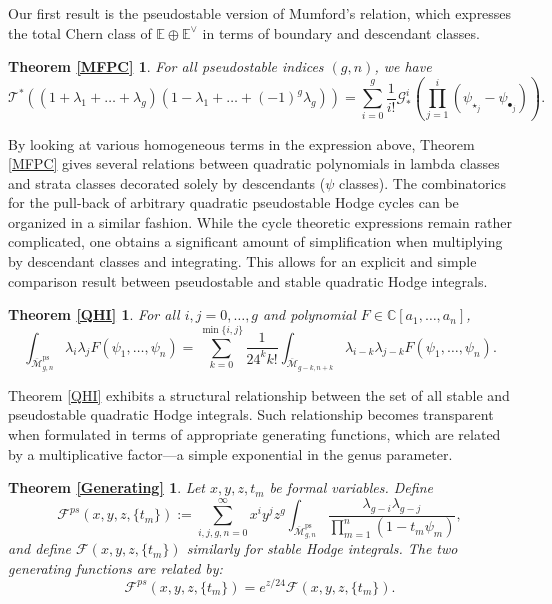 \documentclass[leqno,12pt]{amsart}
\newtheorem*{mt1}{Theorem \ref{MFPC}}
\newtheorem*{mt2}{Theorem \ref{QHI}}
\newtheorem*{mt3}{Theorem \ref{Generating}}
\theoremstyle{remark}
\numberwithin{equation}{section}
\DeclareMathOperator{\ps}{ps}
\begin{document}
Our first result is the pseudostable version of Mumford's relation, which expresses the total Chern class of $\mathbb{E}\oplus \mathbb{E}^\vee$ in terms of boundary and descendant classes.

\begin{mt1} 
For all pseudostable indices $(g, n)$, we have $$\mathcal{T}^*\left((1 + \lambda_1 + \dots + \lambda_g)(1 - \lambda_1 + \dots + (-1)^g\lambda_g)\right) = \sum_{i=0}^g\frac{1}{i!}\mathcal{G}_*^i\left(\prod_{j=1}^i(\psi_{\star_j}-\psi_{\bullet_j})\right).$$
\end{mt1}

By looking at various homogeneous terms in the expression above, Theorem \ref{MFPC} gives several relations between quadratic polynomials in lambda classes and strata classes decorated solely by descendants ($\psi$ classes). 
The combinatorics for the pull-back of arbitrary quadratic pseudostable Hodge cycles can be organized in a similar fashion. While the cycle theoretic expressions remain rather complicated, one obtains a significant amount of simplification when multiplying by descendant classes and integrating. This allows for an explicit and simple
comparison
result between pseudostable and stable quadratic Hodge integrals.

\begin{mt2}\label{ResultB1}
    For all $i, j = 0, \dots, g$ and polynomial $F \in \mathbb{C}[a_1, \dots, a_n]$, $$\int_{\overline{\mathcal{M}}^{\ps}_{g, n}} \lambda_{i}\lambda_{j}F(\psi_1, \dots, \psi_n) = \sum_{k=0}^{\min\{i, j\}} \frac{1}{24^kk!}\int_{\overline{\mathcal{M}}_{g-k, n+k}} \lambda_{i-k}\lambda_{j-k}F(\psi_1, \dots, \psi_n).$$
\end{mt2}

Theorem \ref{QHI} exhibits a structural relationship between the set of all stable and pseudostable quadratic Hodge integrals. Such relationship becomes transparent when formulated in terms of appropriate generating functions, which are related by a multiplicative factor---a simple exponential in the genus parameter.



\begin{mt3}
    Let $x,y,z,t_m$  be formal variables. Define
    $$ 
    \mathcal{F}^{ps}(x, y, z, \{t_m\}):=\sum_{i, j, g, n = 0}^\infty x^iy^jz^g \int_{\overline{\mathcal{M}}^{\ps}_{g, n}} \frac{\lambda_{g-i}\lambda_{g-j}}{\prod_{m=1}^n (1 - t_m\psi_m)},
    $$
     and define $\mathcal{F}(x, y, z, \{t_m\})$  similarly for stable Hodge integrals. The two generating functions are related by: 
    $$
    \mathcal{F}^{ps}(x, y, z, \{t_m\}) = e^{z/24}\mathcal{F}(x, y, z, \{t_m\}).
    $$
\end{mt3} 
\end{document}
